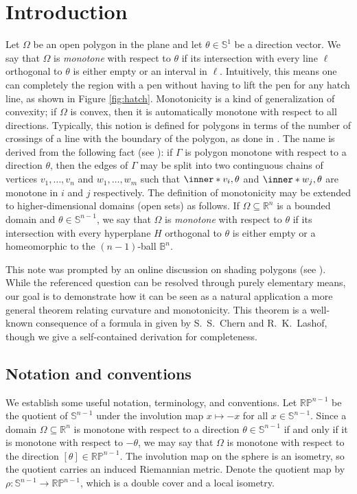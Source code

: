 
\section{Introduction}

Let $\Omega$ be an open polygon in the plane and let $\theta \in \mathbb{S}^1$ be a direction vector.
We say that $\Omega$ is \emph{monotone} with respect to $\theta$ if its intersection with every line $\ell$ orthogonal to $\theta$ is either empty or an interval in $\ell$.
Intuitively, this means one can completely  the region with a pen without having to lift the pen for any hatch line, as shown in Figure \ref{fig:hatch}.
Monotonicity is a kind of generalization of convexity; if $\Omega$ is convex, then it is automatically monotone with respect to all directions.
Typically, this notion is defined for polygons in terms of the number of crossings of a line with the boundary of the polygon, as done in \cite{preparata1985}.
The name is derived from the following fact (see \cite{preparata1981}): if $\Gamma$ is polygon monotone with respect to a direction $\theta$, then the edges of $\Gamma$ may be split into two continguous chains of vertices $v_1, \ldots, v_n$ and $w_1, \ldots, w_m$ such that $\inner*{v_i, \theta}$ and $\inner*{w_j, \theta}$ are monotone in $i$ and $j$ respectively.
The definition of monotonicity may be extended to higher-dimensional domains (open sets) as follows.
If $\Omega \subseteq \mathbb{R}^n$ is a bounded domain and $\theta \in \mathbb{S}^{n-1}$, we say that $\Omega$ is \emph{monotone} with respect to $\theta$ if its intersection with every hyperplane $H$ orthogonal to $\theta$ is either empty or a homeomorphic to the $(n-1)$-ball $\mathbb{B}^n$.

This note was prompted by an online discussion on shading polygons (see \cite{reddit}). While the referenced question can be resolved through purely elementary means, our goal is to demonstrate how it can be seen as a natural application a more general theorem relating curvature and monotonicity. This theorem is a well-known consequence of a formula in \cite{chern1957} given by S.~S.~Chern and R.~K.~Lashof, though we give a self-contained derivation for completeness.



\subsection{Notation and conventions}

We establish some useful notation, terminology, and conventions. Let $\mathbb{RP}^{n-1}$ be the quotient of $\mathbb{S}^{n-1}$ under the involution map $x \mapsto -x$ for all $x \in \mathbb{S}^{n-1}$. Since a domain $\Omega \subseteq \mathbb{R}^n$ is monotone with respect to a direction $\theta \in \mathbb{S}^{n-1}$ if and only if it is monotone with respect to $-\theta$, we may say that $\Omega$ is monotone with respect to the direction $[\theta] \in \mathbb{RP}^{n-1}$. The involution map on the sphere is an isometry, so the quotient carries an induced Riemannian metric. Denote the quotient map by $\rho \colon \mathbb{S}^{n-1} \to \mathbb{RP}^{n-1}$, which is a double cover and a local isometry.


